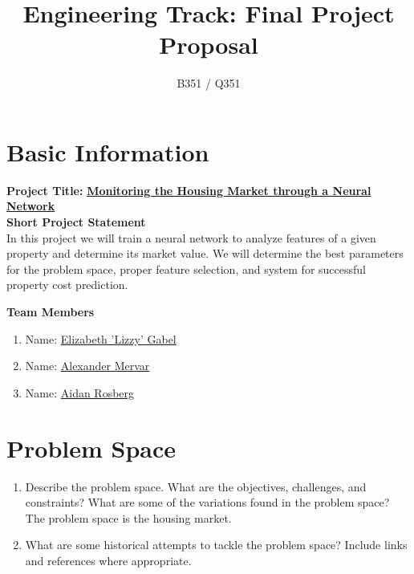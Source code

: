 \documentclass[]{article}
\title{\vspace{-2.5cm}Engineering Track: Final Project Proposal}
\author{B351 / Q351}
\date{}
\begin{document}
\maketitle

\section*{Basic Information}

\begin{multicols}{2}
	
\textbf{Project Title:} \underline{\textbf{Monitoring the Housing Market through a Neural Network}}\\

\vspace{0.25cm}
\textbf{Short Project Statement}\\
In this project we will train a neural network to analyze features of a given property and determine its market value.  We will determine the best parameters for the problem space, proper feature selection, and system for successful property cost prediction.

\columnbreak
\textbf{Team Members}
\begin{enumerate}
	
	\vspace{0.5cm}
	\item Name: \underline{Elizabeth 'Lizzy' Gabel}
	
	\vspace{1cm}
	\item Name: \underline{Alexander Mervar}
	
	\vspace{1cm}
	\item Name: \underline{Aidan Rosberg}
	
	
\end{enumerate}

\end{multicols}

\section{Problem Space}
\begin{enumerate}
	\item Describe the problem space. What are the objectives, challenges, and constraints? What are some of the variations found in the problem space?
	\vspace{0.5cm}
	The problem space is the housing market.

	\item What are some historical attempts to tackle the problem space? Include links and references where appropriate.
\end{enumerate}
\end{document}
